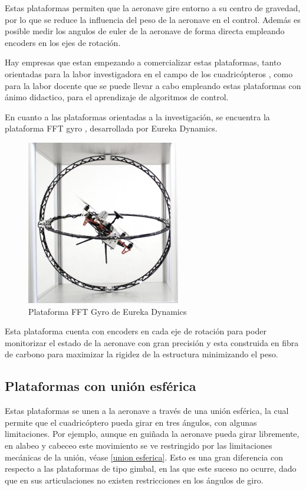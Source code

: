 Estas plataformas permiten que la aeronave gire entorno a su centro de gravedad, por lo que se reduce la influencia del peso de la aeronave en el control. Además es posible medir los angulos de euler de la aeronave de forma directa empleando encoders en los ejes de rotación.

Hay empresas que estan empezando a comercializar estas plataformas, tanto orientadas para la labor investigadora en el campo de los cuadricópteros , como para la labor docente que se puede llevar a cabo empleando estas plataformas con ánimo didactico, para el aprendizaje de algoritmos de control. 

En cuanto a las  plataformas orientadas a la investigación, se encuentra la plataforma FFT gyro , desarrollada por Eureka Dynamics.

\begin{figure}[htb!]
	\centering
	\includegraphics[width=0.6\textwidth]{estadodelarte/fft_gyro}
	\caption{Plataforma FFT Gyro de Eureka Dynamics}
	\label{giro_fft}
\end{figure}

Esta plataforma cuenta con encoders en cada eje de rotación para poder monitorizar el estado de la aeronave con gran precisión y esta construida en fibra de carbono para maximizar la rigidez de la estructura minimizando el peso.

\subsection{Plataformas con unión esférica}

Estas plataformas se unen a la aeronave a través de una unión esférica, la cual permite que el cuadricóptero pueda girar en tres ángulos, con algunas limitaciones. Por ejemplo, aunque en guiñada la aeronave pueda girar libremente, en alabeo y cabeceo este movimiento se ve restringido por las limitaciones mecánicas de la unión, véase \cref{union esferica}. Esto es una gran diferencia con respecto a las plataformas de tipo gimbal, en las que este suceso no ocurre, dado que en sus articulaciones no existen restricciones en los ángulos de giro.

